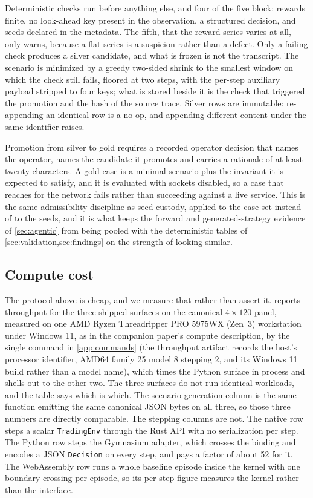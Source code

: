 Deterministic checks run before anything else, and four of the five block: rewards finite, no look-ahead key present in the observation, a structured decision, and seeds declared in the metadata. The fifth, that the reward series varies at all, only warns, because a flat series is a suspicion rather than a defect. Only a failing check produces a silver candidate, and what is frozen is not the transcript. The scenario is minimized by a greedy two-sided shrink to the smallest window on which the check still fails, floored at two steps, with the per-step auxiliary payload stripped to four keys; what is stored beside it is the check that triggered the promotion and the hash of the source trace. Silver rows are immutable: re-appending an identical row is a no-op, and appending different content under the same identifier raises.

Promotion from silver to gold requires a recorded operator decision that names the operator, names the candidate it promotes and carries a rationale of at least twenty characters. A gold case is a minimal scenario plus the invariant it is expected to satisfy, and it is evaluated with sockets disabled, so a case that reaches for the network fails rather than succeeding against a live service. This is the same admissibility discipline as seed custody, applied to the case set instead of to the seeds, and it is what keeps the forward and generated-strategy evidence of \cref{sec:agentic} from being pooled with the deterministic tables of \cref{sec:validation,sec:findings} on the strength of looking similar.

\subsection{Compute cost}\label{sec:protocol-compute}

The protocol above is cheap, and we measure that rather than assert it.  reports throughput for the three shipped surfaces on the canonical $4 \times 120$ panel, measured on one AMD Ryzen Threadripper PRO 5975WX (Zen~3) workstation under Windows 11, as in the companion paper's compute description, by the single command in \cref{app:commands} (the throughput artifact records the host's processor identifier, AMD64 family 25 model 8 stepping 2, and its Windows 11 build rather than a model name), which times the Python surface in process and shells out to the other two. The three surfaces do not run identical workloads, and the table says which is which. The scenario-generation column is the same function emitting the same canonical JSON bytes on all three, so those three numbers are directly comparable. The stepping columns are not. The native row steps a scalar \texttt{TradingEnv} through the Rust API with no serialization per step. The Python row steps the Gymnasium adapter, which crosses the binding and encodes a JSON \texttt{Decision} on every step, and pays a factor of about 52 for it. The WebAssembly row runs a whole baseline episode inside the kernel with one boundary crossing per episode, so its per-step figure measures the kernel rather than the interface.

